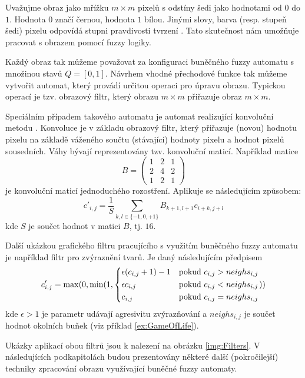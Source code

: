 \documentclass[a4paper,10pt]{article}
\begin{document}
Uvažujme obraz jako mřížku $m \times m$ pixelů s odstíny šedi jako hodnotami od $0$ do $1$. Hodnota $0$ značí černou, hodnota $1$ bílou. Jinými slovy, barva (resp. stupeň šedi) pixelu odpovídá stupni pravdivosti tvrzení . Tato skutečnost nám umožňuje pracovat s obrazem pomocí fuzzy logiky.

Každý obraz tak můžeme považovat za konfiguraci buněčného fuzzy automatu s množinou stavů $Q = [0,1]$. Návrhem vhodné přechodové funkce tak můžeme vytvořit automat, který provádí určitou operaci pro úpravu obrazu. Typickou operací je tzv. obrazový filtr, který obrazu $m \times m$ přiřazuje obraz $m \times m$.

Speciálním případem takového automatu je automat realizující konvoluční metodu \cite{Rus-ImaProHan}. Konvoluce je v základu obrazový filtr, který přiřazuje (novou) hodnotu pixelu na základě váženého součtu (stávající) hodnoty pixelu a hodnot pixelů sousedních. Váhy bývají reprezentovány tzv. konvoluční maticí. Například matice
$$
  B = \begin{pmatrix}
       1 & 2 & 1 \\
       2 & 4 & 2 \\
       1 & 2 & 1 
      \end{pmatrix}
$$
je konvoluční maticí jednoduchého rozostření. Aplikuje se následujícím způsobem:
$$
  c'_{i,j} = \frac{1}{S} \sum_{k,l \in \{-1, 0, +1\}} B_{k+1, l+1} c_{i+k, j+l}
$$
kde $S$ je součet hodnot v matici $B$, tj. $16$.

Další ukázkou grafického filtru pracujícího s využitím buněčného fuzzy automatu je například filtr pro zvýraznění tvarů. Je daný následujícím předpisem
$$
  c'_{i,j} = \max(0, \min(1, 
    \begin{dcases}
      \epsilon (c_{i,j} + 1) - 1	& \text{pokud $c_{i,j} > neighs_{i,j}$} \\
      \epsilon c_{i,j}			& \text{pokud $c_{i,j} < neighs_{i,j}$} \\
      c_{i,j}	& \text{pokud $c_{i,j} = neighs_{i,j}$} 
    \end{dcases}
    ))
$$
kde $\epsilon > 1$ je parametr udávají agresivitu zvýrazňování a $neighs_{i,j}$ je součet hodnot okolních buňek (viz příklad \ref{ex:GameOfLife}).

Ukázky aplikací obou filtrů jsou k nalezení na obrázku \ref{img:Filters}. V následujících podkapitolách budou prezentovány některé další (pokročilejší) techniky zpracování obrazu využívající buněčné fuzzy automaty.
\end{document}
